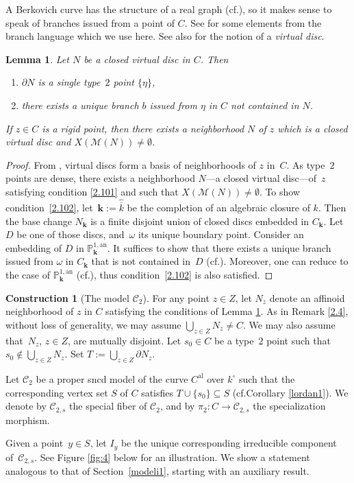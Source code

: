 \documentclass[10pt]{amsart}
\newcommand{\cf}{cf.}
\newcommand{\al}{\mathrm{al}}
\newcommand{\bbk}{{\boldsymbol{k}}}%
\newtheorem{lm}[thm]{Lemma}
\theoremstyle{definition}
\newtheorem{cons}{Construction}
\begin{document}
A Berkovich curve has the structure of a real graph (\cf \cite[1.3.1]{duc}), so it makes sense to speak of branches issued from a point of $C$. See \cite[1.7]{duc} for some elements from the branch language which we use here. See also \cite[p.\,210]{duc} for the notion of a \emph{virtual disc}.

\begin{lm} \label{2.10}
Let $N$ be a closed virtual disc in $C$. Then
\begin{enumerate}
\item\label{2.101}
$\partial{N}$ is a single type~$2$ point $\{\eta\}$,
\item\label{2.102}
there exists a unique branch $b$ issued from $\eta$ in $C$ not contained in $N$.
\end{enumerate}
If $z \in C$ is a rigid point, then there exists a neighborhood $N$ of $z$ which is a closed virtual disc and $X(\mathscr{M}(N)) \neq \emptyset$.
\end{lm}

\begin{proof}
From \cite[Th.\,4.5.4]{duc}, virtual discs form a basis of neighborhoods of $z$ in~$C$. As type~$2$ points are dense, there exists a neighborhood $N$---a closed virtual disc---of~$z$ satisfying condition \eqref{2.101} and such that $X(\mathscr{M}(N)) \neq \emptyset$. To show condition~\eqref{2.102}, let~$\bbk:=\widehat{\overline{k}}$ be the completion of an algebraic closure of $k$. Then the base change $N_{\bbk}$ is a finite disjoint union of closed discs embedded in $C_{\bbk}$. Let $D$ be one of those discs, and~$\omega$ its unique boundary point. Consider an embedding of $D$ in $\mathbb{P}_{\bbk}^{1, \mathrm{an}}$. It suffices to show that there exists a unique branch issued from $\omega$ in $C_{\bbk}$ that is not contained in~$D$ (\cf \cite[1.7.2]{duc}). Moreover, one can reduce to the case of $\mathbb{P}_{\bbk}^{1, \mathrm{an}}$ (\cf \cite[4.2.11.1]{duc}), thus condition~\eqref{2.102} is also satisfied.
\end{proof}

\begin{cons}[The model $\mathscr{C}_2$] \label{model2} For any point $z \in Z$, let $N_z$ denote an affinoid neighborhood of $z$ in $C$ satisfying the conditions of Lemma \ref{2.10}. As in Remark \ref{2.4}, without loss of generality, we may assume $\bigcup_{z \in Z} N_z\neq C$. We may also assume that~$N_z$, $z \in Z$, are mutually disjoint. Let $s_0 \in C$ be a type~$2$ point such that $s_0 \not \in \bigcup_{z \in Z} N_z$. Set $T:=\bigcup_{{z \in Z}} \partial{N_z}$.

Let $\mathscr{C}_2$ be a proper sncd model of the curve $C^{\al}$ over $k^{\circ}$ such that the corresponding vertex set $S$ of $C$ satisfies $T \cup \{s_0\} \subseteq S$ (\cf Corollary \ref{lordan1}). We denote by $\mathscr{C}_{2,s}$ the special fiber of $\mathscr{C}_2$, and by $\pi_2:C \to \mathscr{C}_{2,s}$ the specialization morphism.
\end{cons}
Given a point~$y \in S$, let $I_y$ be the unique corresponding irreducible component of~$\mathscr{C}_{2,s}$. See Figure \ref{fig:4} below for an illustration. We show a statement analogous to that of Section~\ref{modeli1}, starting with an auxiliary result.
\end{document}

